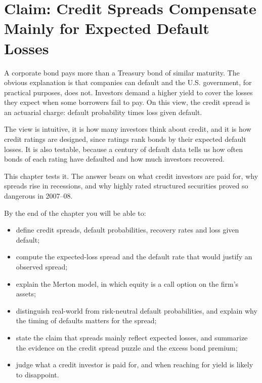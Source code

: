 \makeatletter
{}
\makeatother

\chapter{Claim: Credit Spreads Compensate Mainly for Expected Default Losses}
\label{ch:17}

A corporate bond pays more than a Treasury bond of similar maturity. The obvious explanation is that companies can default and the U.S. government, for practical purposes, does not. Investors demand a higher yield to cover the losses they expect when some borrowers fail to pay. On this view, the credit spread is an actuarial charge: default probability times loss given default.

The view is intuitive, it is how many investors think about credit, and it is how credit ratings are designed, since ratings rank bonds by their expected default losses. It is also testable, because a century of default data tells us how often bonds of each rating have defaulted and how much investors recovered.

This chapter tests it. The answer bears on what credit investors are paid for, why spreads rise in recessions, and why highly rated structured securities proved so dangerous in 2007--08.

By the end of the chapter you will be able to:

\begin{itemize}
  \item define credit spreads, default probabilities, recovery rates and loss given default;
  \item compute the expected-loss spread and the default rate that would justify an observed spread;
  \item explain the Merton model, in which equity is a call option on the firm's assets;
  \item distinguish real-world from risk-neutral default probabilities, and explain why the timing of defaults matters for the spread;
  \item state the claim that spreads mainly reflect expected losses, and summarize the evidence on the credit spread puzzle and the excess bond premium;
  \item judge what a credit investor is paid for, and when reaching for yield is likely to disappoint.
\end{itemize}

